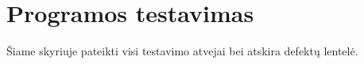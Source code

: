 \section{Programos testavimas}
Šiame skyriuje pateikti visi testavimo atvejai bei atskira defektų lentelė.



\clearpage

